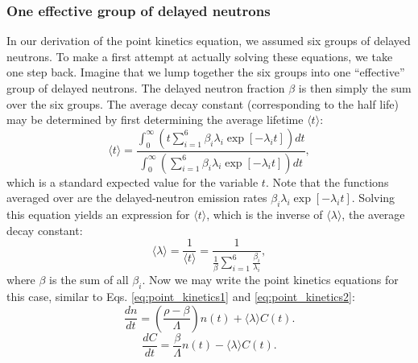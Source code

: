 \subsubsection*{One effective group of delayed neutrons}
In our derivation of the point kinetics equation, we assumed six groups of delayed neutrons. To make a first attempt at actually solving these equations, we take one step back. Imagine that we lump together the six groups into one ``effective'' group of delayed neutrons. The delayed neutron fraction $\beta$ is then simply the sum over the six groups. The average decay constant (corresponding to the half life) may be determined by first determining the average lifetime $\langle t \rangle$:
\begin{equation}
	\langle t \rangle = \frac{\int_0^\infty \left( t \sum_{i=1}^6 \beta_i \lambda_i \exp[-\lambda_i t] \right) dt}{\int_0^\infty \left( \sum_{i=1}^6 \beta_i \lambda_i \exp[-\lambda_i t] \right) dt},
\end{equation}
which is a standard expected value for the variable $t$. Note that the functions averaged over are the delayed-neutron emission rates $\beta_i \lambda_i \exp[-\lambda_i t]$. Solving this equation yields an expression for $\langle t \rangle$, which is the inverse of $\langle \lambda \rangle$, the average decay constant:
\begin{equation}
	\langle \lambda \rangle = \frac{1}{\langle t \rangle} = \frac{1}{\frac{1}{\beta} \sum_{i=1}^6 \frac{\beta_i}{\lambda_i}},
\end{equation}
where $\beta$ is the sum of all $\beta_i$. Now we may write the point kinetics equations for this case, similar to Eqs. \ref{eq:point_kinetics1} and \ref{eq:point_kinetics2}:
\begin{equation}
	\frac{dn}{dt} = \left( \frac{\rho - \beta}{\Lambda} \right) n(t) + \langle \lambda \rangle C(t).
	\label{eq:point_kinetics1_one_group}
\end{equation}
\begin{equation}
	\frac{d C}{d t} = \frac{\beta}{\Lambda} n(t) - \langle \lambda \rangle C(t).
	\label{eq:point_kinetics2_one_group}
\end{equation}


